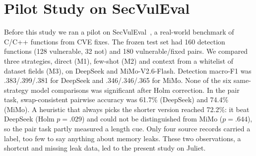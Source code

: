\section{Pilot Study on SecVulEval}
\label{app:pilot}
Before this study we ran a pilot on SecVulEval~\cite{ahmed2026secvuleval}, a real-world benchmark of C/C++ functions from CVE fixes.
The frozen test set had 160 detection functions (128 vulnerable, 32 not) and 180 vulnerable/fixed pairs. %
We compared three strategies, direct (M1), few-shot (M2) and context from a whitelist of dataset fields (M3), on DeepSeek and MiMo-V2.6-Flash.
Detection macro-F1 was .383/.399/.381 for DeepSeek and .346/.346/.365 for MiMo.
None of the six same-strategy model comparisons was significant after Holm correction. %
In the pair task, swap-consistent pairwise accuracy was 61.7\% (DeepSeek) and 74.4\% (MiMo).
A heuristic that always picks the shorter version reached 72.2\%: it beat DeepSeek (Holm $p=.029$) and could not be distinguished from MiMo ($p=.644$), so the pair task partly measured a length cue. %
Only four source records carried a \cwe{} label, too few to say anything about memory leaks.
These two observations, a shortcut and missing leak data, led to the present study on Juliet.

